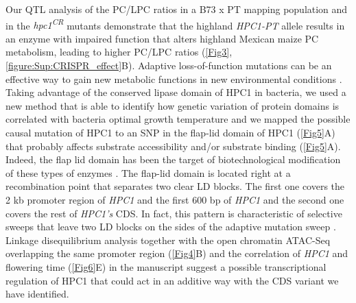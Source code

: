 \documentclass[9pt,twocolumn,twoside,lineno]{biorxiv}
\newcommand{\hpc}{\textit{HPC1}\xspace}
\begin{document}
Our QTL analysis of the PC/LPC ratios in a B73 x PT mapping population and in the \textit{hpc1\textsuperscript{CR}} mutants demonstrate that the highland \textit{HPC1-PT} allele results in an enzyme with impaired function that alters highland Mexican maize PC metabolism, leading to higher PC/LPC ratios (\cref{Fig3}, \cref{figure:Sup:CRISPR_effect}B). 
Adaptive loss-of-function mutations can be an effective way to gain new metabolic functions in new environmental conditions \cite{Hottes2013-np}.
Taking advantage of the conserved lipase domain of HPC1 in bacteria, we used a new method that is able to identify how genetic variation of protein domains is correlated with bacteria optimal growth temperature \cite{Jensen2021-iv, Jensen2021-zm} and we mapped the possible causal mutation of HPC1 to an SNP in the flap-lid domain of HPC1 (\cref{Fig5}A) that probably affects substrate  accessibility and/or substrate binding (\cref{Fig5}A). 
Indeed, the flap lid domain has been the target of biotechnological modification of these types of enzymes \cite{Khan2017-ua}.
The flap-lid domain is located right at a recombination point that separates two clear LD blocks. 
The first one covers the 2 kb promoter region of \hpc and the first 600 bp of \hpc and the second one covers the rest of \textit{HPC1's} CDS. 
In fact, this pattern is characteristic of selective sweeps that leave two LD blocks on the sides of the adaptive mutation sweep \cite{Kim2004-pa}. 
Linkage disequilibrium analysis together with the open chromatin ATAC-Seq overlapping the same promoter region (\cref{Fig4}B) and the correlation of \hpc and flowering time (\cref{Fig6}E) in the manuscript suggest a possible transcriptional regulation of HPC1 that could act in an additive way with the CDS variant we have identified.   
\end{document}
